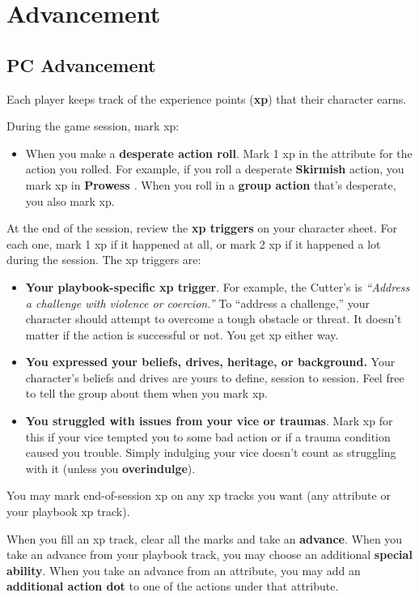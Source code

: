\documentclass[11pt,fleqn,a5paper]{book}
\newcommand{\gameterm}[1]{\textbf{#1}}
\begin{document}
\chapter{Advancement}

\section{PC Advancement}

Each player keeps track of the experience points (\textbf{xp}) that their character earns.

During the game session, mark xp:

\begin{itemize}
	\item When you make a \textbf{desperate action roll}. Mark 1 xp in the attribute for the action you rolled. For example, if you roll a desperate \gameterm{Skirmish}  action, you mark xp in \gameterm{Prowess} \emph{.} When you roll in a \textbf{group action} that’s desperate, you also mark xp.
\end{itemize}

At the end of the session, review the \textbf{xp triggers} on your character sheet. For each one, mark 1 xp if it happened at all, or mark 2 xp if it happened a lot during the session. The xp triggers are:

\begin{itemize}
	\item \textbf{Your playbook-specific xp trigger}. For example, the Cutter’s is \emph{“Address a challenge with violence or coercion.”} To “address a challenge,” your character should attempt to overcome a tough obstacle or threat. It doesn’t matter if the action is successful or not. You get xp either way.
	\item \textbf{You expressed your beliefs, drives, heritage, or background.} Your character’s beliefs and drives are yours to define, session to session. Feel free to tell the group about them when you mark xp.
	\item \textbf{You struggled with issues from your vice or traumas}. Mark xp for this if your vice tempted you to some bad action or if a trauma condition caused you trouble. Simply indulging your vice doesn’t count as struggling with it (unless you \textbf{overindulge}).
\end{itemize}

You may mark end-of-session xp on any xp tracks you want (any attribute or your playbook xp track).

When you fill an xp track, clear all the marks and take an \textbf{advance}. When you take an advance from your playbook track, you may choose an additional \textbf{special ability}. When you take an advance from an attribute, you may add an \textbf{additional action dot} to one of the actions under that attribute.
\end{document}
